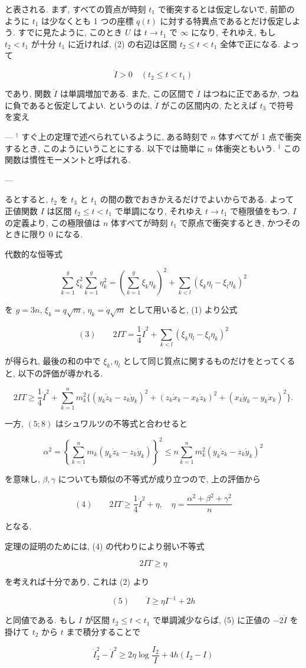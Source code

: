 \documentclass[dvipdfmx, leqno]{jsbook}
\begin{document}
と表される. まず, すべての質点が時刻 $t_1$ で衝突するとは仮定しないで, 前節のように $t_1$ は少なくとも 1 つの座標 $q(t)$ に対する特異点であるとだけ仮定しよう. すでに見たように, このとき $U$ は $t \to t_1$ で $\infty$ になり, それゆえ, もし $t_2 < t_1$ が十分 $t_1$ に近ければ, (2) の右辺は区間 $t_2 \leq t < t_1$ 全体で正になる. よって

$$\ddot{I} > 0 \quad (t_2 \leq t < t_1)$$

であり, 関数 $\dot{I}$ は単調増加である. また, この区間で $\dot{I}$ はつねに正であるか, つねに負であると仮定してよい. というのは, $\dot{I}$ がこの区間内の, たとえば $t_3$ で符号を変え

---
$^\dagger$ すぐ上の定理で述べられているように, ある時刻で $n$ 体すべてが 1 点で衝突するとき, このようにいうことにする. 以下では簡単に $n$ 体衝突ともいう.
$^\ddagger$ この関数は慣性モーメントと呼ばれる.

---


るとすると, $t_2$ を $t_3$ と $t_1$ の間の数でおきかえるだけでよいからである. よって正値関数 $I$ は区間 $t_2 \leq t < t_1$ で単調になり, それゆえ $t \to t_1$ で極限値をもつ. $I$ の定義より, この極限値は $n$ 体すべてが時刻 $t_1$ で原点で衝突するとき, かつそのときに限り $0$ になる.

代数的な恒等式

$$\sum_{k=1}^{g} \xi_k^2 \sum_{k=1}^{g} \eta_k^2 = \left( \sum_{k=1}^{g} \xi_k \eta_k \right)^2 + \sum_{k<l} (\xi_k \eta_l - \xi_l \eta_k)^2$$

を $g = 3n, \, \xi_k = q\sqrt{m}, \, \eta_k = \dot{q}\sqrt{m}$ として用いると, (1) より公式

$$(3) \qquad 2IT = \frac{1}{4} \dot{I}^2 + \sum_{k<l} (\xi_k \eta_l - \xi_l \eta_k)^2$$

が得られ, 最後の和の中で $\xi_k, \eta_l$ として同じ質点に関するものだけをとってくると, 以下の評価が導かれる.

$$2IT \geq \frac{1}{4} \dot{I}^2 + \sum_{k=1}^{n} m_k^2 \{ (y_k \dot{z}_k - z_k \dot{y}_k)^2 + (z_k \dot{x}_k - x_k \dot{z}_k)^2 + (x_k \dot{y}_k - y_k \dot{x}_k)^2 \}.$$

一方, $(5;8)$ はシュワルツの不等式と合わせると

$$\alpha^2 = \left\{ \sum_{k=1}^{n} m_k (y_k \dot{z}_k - z_k \dot{y}_k) \right\}^2 \leq n \sum_{k=1}^{n} m_k^2 (y_k \dot{z}_k - z_k \dot{y}_k)^2$$

を意味し, $\beta, \gamma$ についても類似の不等式が成り立つので, 上の評価から

$$(4) \qquad 2IT \geq \frac{1}{4} \dot{I}^2 + \eta, \quad \eta = \frac{\alpha^2 + \beta^2 + \gamma^2}{n}$$

となる.

定理の証明のためには, (4) の代わりにより弱い不等式

$$2IT \geq \eta$$

を考えれば十分であり, これは (2) より

$$(5) \qquad \ddot{I} \geq \eta I^{-1} + 2h$$

と同値である. もし $I$ が区間 $t_2 \leq t < t_1$ で単調減少ならば, (5) に正値の $-2\dot{I}$ を掛けて $t_2$ から $t$ まで積分することで

$$\dot{I}_2^2 - \dot{I}^2 \geq 2\eta \log \frac{I_2}{I} + 4h(I_2 - I)$$
\end{document}
